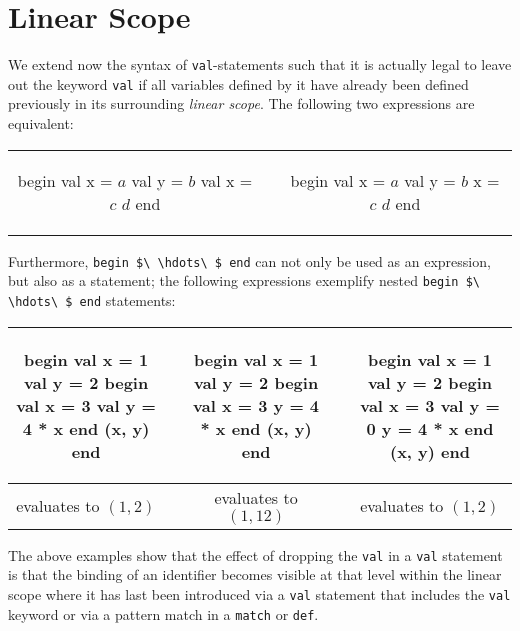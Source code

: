 \documentclass[11pt]{amsart}
\newcommand{\babelsrc}[1] {\lstinline!#1!}
\begin{document}
\section{Linear Scope}
We extend now the syntax of \babelsrc{val}-statements such that it is actually legal to leave out the keyword \babelsrc{val} if all variables defined by it have already been defined  previously in its surrounding \emph{linear scope}. The following two expressions are equivalent:
\begin{center}
\begin{tabular}{ccc}
\begin{babellisting}
begin
  val x = $a$ 
  val y = $b$
  val x = $c$
  $d$
end
\end{babellisting}
& \hspace{2cm} &
\begin{babellisting}
begin
  val x = $a$ 
  val y = $b$
  x = $c$
  $d$
end
\end{babellisting}
\end{tabular}
\end{center}
Furthermore, \babelsrc{begin $\ \hdots\ $ end} can not only be used as an expression, but also as a statement; the following expressions exemplify nested  \babelsrc{begin $\ \hdots\ $ end} statements:
\begin{center}
\begin{tabular}{ccccc}
\begin{babellisting}
begin
  val x = 1 
  val y = 2
  begin
    val x = 3
    val y = 4 * x
  end
  (x, y)
end
\end{babellisting}
& \hspace{1cm} &
\begin{babellisting}
begin
  val x = 1 
  val y = 2
  begin
    val x = 3
    y = 4 * x
  end
  (x, y)
end
\end{babellisting}
& \hspace{1cm} &
\begin{babellisting}
begin
  val x = 1 
  val y = 2
  begin
    val x = 3
    val y = 0
    y = 4 * x
  end
  (x, y)
end
\end{babellisting}\\\hline
evaluates to $(1, 2)$ & &
evaluates to $(1, 12)$ & &
evaluates to $(1, 2)$ \\[0.5cm]
\end{tabular}
\end{center}
The above examples show that the effect of dropping the \babelsrc{val} in a \babelsrc{val} statement is that the binding of an identifier becomes visible at that level within the linear scope where it has last been introduced via a \babelsrc{val} statement that includes the \babelsrc{val} keyword or via a pattern match in a \babelsrc{match} or \babelsrc{def}.
\end{document}
